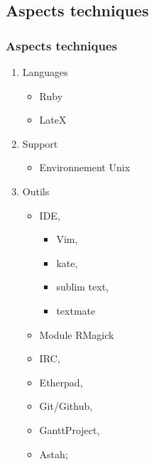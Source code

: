 \documentclass[12pt]{beamer}
\begin{document}
\subsection{Aspects techniques}
    \begin{frame}
    \frametitle{Aspects techniques}
    
        \begin{enumerate}
            \item Languages
            \begin{itemize}
                \item Ruby
                \item LateX
            \end{itemize}
                
            \item Support
            \begin{itemize}
                \item Environnement Unix
            \end{itemize}
                
            \item Outils
            \begin{itemize}
                \item IDE,
                \begin{itemize}
                    \item Vim,
                    \item kate,
                    \item sublim text,
                    \item textmate
                \end{itemize}
                \item Module RMagick
                \item IRC,
                \item Etherpad,
                \item Git/Github,
                \item GanttProject,
                \item Astah;
                    
            \end{itemize}
                
                    
        \end{enumerate}
\end{frame}
\end{document}

